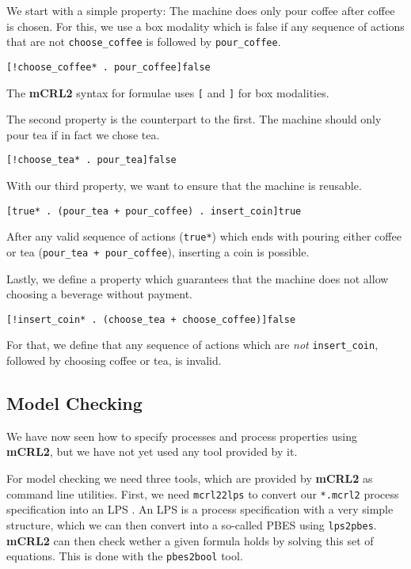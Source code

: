 \documentclass{clseminar}
\begin{document}
  We start with a simple property: The machine does only pour coffee after coffee is chosen. For this, we use a box modality which is false if any sequence of actions that are not \texttt{choose\_coffee} is followed by \texttt{pour\_coffee}.

  \begin{lstlisting}[language=mCRL2]
[!choose_coffee* . pour_coffee]false
  \end{lstlisting}

  The \textbf{mCRL2} syntax for formulae uses \texttt{[} and \texttt{]} for box modalities.

  The second property is the counterpart to the first. The machine should only pour tea if in fact we chose tea.

  \begin{lstlisting}[language=mCRL2]
[!choose_tea* . pour_tea]false
  \end{lstlisting}

  With our third property, we want to ensure that the machine is reusable.

  \begin{lstlisting}[language=mCRL2]
[true* . (pour_tea + pour_coffee) . insert_coin]true
  \end{lstlisting}

  After any valid sequence of actions (\texttt{true*}) which ends with pouring either coffee or tea (\texttt{pour\_tea + pour\_coffee}), inserting a coin is possible.

  Lastly, we define a property which guarantees that the machine does not allow choosing a beverage without payment.

  \begin{lstlisting}[language=mCRL2]
[!insert_coin* . (choose_tea + choose_coffee)]false
  \end{lstlisting}

  For that, we define that any sequence of actions which are \textit{not} \texttt{insert\_coin}, followed by choosing coffee or tea, is invalid.

  \subsection{Model Checking}

  We have now seen how to specify processes and process properties using \textbf{mCRL2}, but we have not yet used any tool provided by it.

  For model checking we need three tools, which are provided by \textbf{mCRL2} as command line utilities. First, we need \texttt{mcrl22lps} to convert our \texttt{*.mcrl2} process specification into an LPS \cite[Linear Process Specifications]{mcrl2doc}. An LPS is a process specification with a very simple structure, which we can then convert into a so-called PBES \cite[Parametrized Boolean Equation Systems]{mcrl2doc} using \texttt{lps2pbes}. \textbf{mCRL2} can then check wether a given formula holds by solving this set of equations. This is done with the \texttt{pbes2bool} tool.
\end{document}
